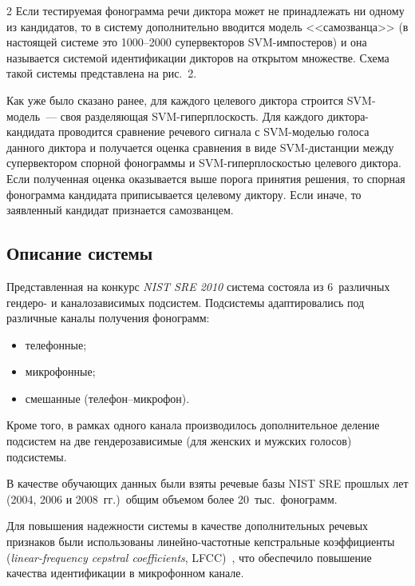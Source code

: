 \begin{multicols}{2}
  Если тестируемая фонограмма речи диктора может не принадлежать ни одному 
из кандидатов, то в систему дополнительно вводится модель <<самозванца>> (в 
настоящей системе это 1000--2000 супервекторов SVM-им\-пос\-те\-ров) и она 
называется системой идентификации дикторов на открытом множестве. Схема 
такой системы представлена на рис.~2.
  

  
  Как уже было сказано ранее, для каждого целевого диктора строится 
SVM-мо\-дель~--- своя разделяющая SVM-ги\-пер\-плос\-кость. Для 
каждого дик\-то\-ра-кан\-ди\-да\-та проводится сравнение речевого сигнала с 
SVM-мо\-делью голоса данного диктора и получается оценка сравнения в 
виде SVM-дис\-тан\-ции между супервектором спорной фонограммы и 
  SVM-ги\-пер\-плос\-костью целевого диктора. Если полученная оценка 
оказывается выше порога принятия решения, то спорная фонограмма кандидата 
приписывается целевому диктору. Если иначе, то заявленный кандидат 
признается самозванцем.

\vspace*{-6pt}

\subsection{Описание системы} %
  
  Представленная на конкурс \textit{NIST SRE 2010} сис\-те\-ма состояла из 
6~различных гендеро- и каналозависимых подсистем. Подсистемы 
адаптировались под различные каналы получения фонограмм:\\[-15pt]
  \begin{itemize}
\item телефонные;\\[-15pt]
\item микрофонные;\\[-15pt]
\item смешанные (телефон--мик\-ро\-фон).\\[-15pt]
\end{itemize}

  Кроме того, в рамках одного канала производилось дополнительное деление 
подсистем на две гендерозависимые (для женских и мужских голосов) 
подсистемы. 
  
  В качест\-ве обучающих данных \mbox{были} взяты ре\-че\-вые базы {NIST SRE} 
прошлых лет (2004, 2006 и 2008~гг.)\ общим объемом более 20~тыс.\ фонограмм.
  
  Для повышения надежности системы в каче\-ст\-ве дополнительных речевых 
признаков \mbox{были} использованы ли\-ней\-но-час\-тот\-ные кепстральные 
коэффициенты (\textit{linear-frequency cepstral coefficients}, LFCC)~\cite{2b}, что 
обеспечило повышение качества идентификации в микрофонном канале. 
 \begin{figure} %
     \vspace*{1pt}
 \begin{center}
 \mbox{%
 \epsfxsize=134.412mm
 }
 \end{center}
 \vspace*{-9pt}
  \end{figure}


\end{multicols}

